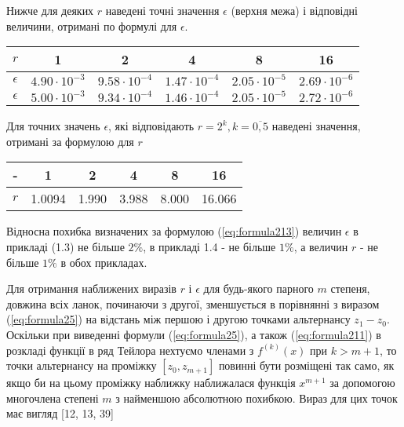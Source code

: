 \documentclass[ukrainian,14pt]{extarticle}
\begin{document}
    Нижче для деяких $r$ наведені точні значення $\epsilon$ (верхня межа) і відповідні величини, отримані по формулі для $\epsilon$.
    
\bgroup
\def\arraystretch{1.5}
\begin{center}
\begin{tabular}{ c | c |
c | c | c | c}
 $r$ & 1 & 2 & 4 & 8 & 16 \\
 \hline
 $\epsilon$ & $4.90 \cdot 10^{-3}$ & $9.58 \cdot 10^{-4}$ & $1.47 \cdot 10^{-4}$ & $2.05 \cdot 10^{-5}$ & $2.69 \cdot 10^{-6}$ \\  
 \hline
 $\epsilon$ & $5.00 \cdot 10^{-3}$ & $9.34 \cdot 10^{-4}$ & $1.46 \cdot 10^{-4}$ & $2.05 \cdot 10^{-5}$ & $2.72 \cdot 10^{-6}$ \\  

\end{tabular}
\end{center}
\egroup

Для точних значень $\epsilon$, які відповідають $r = 2^k, k = \overline{0, 5}$ наведені значення, отримані за формулою для $r$

\bgroup
\def\arraystretch{1.5}
\begin{center}
\begin{tabular}{ c | c |
c | c | c | c}
 - & 1 & 2 & 4 & 8 & 16 \\
 \hline
 $r$ & 1.0094 & 1.990 & 3.988 & 8.000 & 16.066 \\  

\end{tabular}
\end{center}
\egroup

Відносна похибка визначених за формулою (\ref{eq:formula213}) величин $\epsilon$ в прикладі (1.3) не більше $2\%$, в прикладі 1.4 - не більше $1\%$, а величин $r$ - не більше $1\%$ в обох прикладах.

Для отримання наближених виразів $r$ і $\epsilon$ для будь-якого парного $m$ степеня, довжина всіх ланок, починаючи з другої, зменшується в порівнянні з виразом (\ref{eq:formula25}) на відстань між першою і другою точками альтернансу $z_1 - z_0$. Оскільки при виведенні формули (\ref{eq:formula25}), а також (\ref{eq:formula211}) в розкладі функції в ряд Тейлора нехтуємо членами з $f^{(k)}(x)$ при $k > m + 1$, то точки альтернансу на проміжку $[z_0, z_{m+1}]$ повинні бути розміщені так само, як якщо би на цьому проміжку наближку наближалася функція $x^{m+1}$ за допомогою многочлена степені $m$ з найменшою абсолютною похибкою. Вираз для цих точок має вигляд [12, 13, 39]
\end{document}
